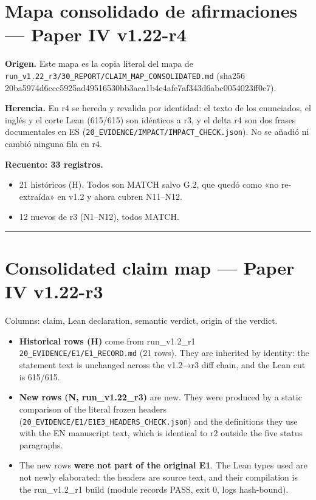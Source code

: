 \documentclass[
]{article}
\author{}
\date{}
\providecommand{\tightlist}{%
  \setlength{\itemsep}{0pt}\setlength{\parskip}{0pt}}
\begin{document}
\section{Mapa consolidado de afirmaciones --- Paper IV
v1.22-r4}\label{mapa-consolidado-de-afirmaciones--paper-iv-v122-r4}

\textbf{Origen.} Este mapa es la copia literal del mapa de
\texttt{run\_v1.22\_r3/30\_REPORT/CLAIM\_MAP\_CONSOLIDATED.md} (sha256
20ba5974d6ccc5925ad49516530bb3aca1b4e4afe7af343d6abc0054023ff0c7).

\textbf{Herencia.} En r4 se hereda y revalida por identidad: el texto de
los enunciados, el inglés y el corte Lean (615/615) son idénticos a r3,
y el delta r4 son dos frases documentales en ES
(\texttt{20\_EVIDENCE/IMPACT/IMPACT\_CHECK.json}). No se añadió ni
cambió ninguna fila en r4.

\textbf{Recuento: 33 registros.}

\begin{itemize}
\tightlist
\item
  21 históricos (H). Todos son MATCH salvo G.2, que quedó como «no
  re-extraída» en v1.2 y ahora cubren N11--N12.
\item
  12 nuevos de r3 (N1--N12), todos MATCH.
\end{itemize}

\begin{center}\rule{0.5\linewidth}{0.5pt}\end{center}

\section{Consolidated claim map --- Paper IV
v1.22-r3}\label{consolidated-claim-map--paper-iv-v122-r3}

Columns: claim, Lean declaration, semantic verdict, origin of the
verdict.

\begin{itemize}
\tightlist
\item
  \textbf{Historical rows (H)} come from run\_v1.2\_r1
  \texttt{20\_EVIDENCE/E1/E1\_RECORD.md} (21 rows). They are inherited
  by identity: the statement text is unchanged across the v1.2→r3 diff
  chain, and the Lean cut is 615/615.
\item
  \textbf{New rows (N, run\_v1.22\_r3)} are new. They were produced by a
  static comparison of the literal frozen headers
  (\texttt{20\_EVIDENCE/E1/E1E3\_HEADERS\_CHECK.json}) and the
  definitions they use with the EN manuscript text, which is identical
  to r2 outside the five status paragraphs.
\item
  The new rows \textbf{were not part of the original E1}. The Lean types
  used are not newly elaborated: the headers are source text, and their
  compilation is the run\_v1.2\_r1 build (module records PASS, exit 0,
  logs hash-bound).
\end{itemize}
\end{document}
